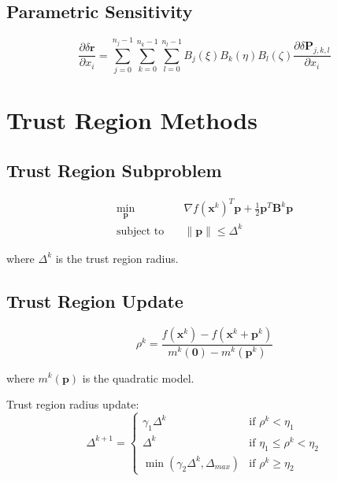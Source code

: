 \documentclass{article}
\begin{document}
\subsection{Parametric Sensitivity}
\begin{equation}
\frac{\partial \delta \mathbf{r}}{\partial x_i} = \sum_{j=0}^{n_j-1} \sum_{k=0}^{n_k-1} \sum_{l=0}^{n_l-1} B_j(\xi) B_k(\eta) B_l(\zeta) \frac{\partial \delta \mathbf{P}_{j,k,l}}{\partial x_i}
\end{equation}

\section{Trust Region Methods}

\subsection{Trust Region Subproblem}
\begin{align}
\min_{\mathbf{p}} \quad &\nabla f(\mathbf{x}^k)^T \mathbf{p} + \frac{1}{2} \mathbf{p}^T \mathbf{B}^k \mathbf{p} \\
\text{subject to} \quad &\|\mathbf{p}\| \leq \Delta^k
\end{align}

where $\Delta^k$ is the trust region radius.

\subsection{Trust Region Update}
\begin{equation}
\rho^k = \frac{f(\mathbf{x}^k) - f(\mathbf{x}^k + \mathbf{p}^k)}{m^k(\mathbf{0}) - m^k(\mathbf{p}^k)}
\end{equation}

where $m^k(\mathbf{p})$ is the quadratic model.

Trust region radius update:
\begin{equation}
\Delta^{k+1} = \begin{cases}
\gamma_1 \Delta^k & \text{if } \rho^k < \eta_1 \\
\Delta^k & \text{if } \eta_1 \leq \rho^k < \eta_2 \\
\min(\gamma_2 \Delta^k, \Delta_{max}) & \text{if } \rho^k \geq \eta_2
\end{cases}
\end{equation}
\end{document}
